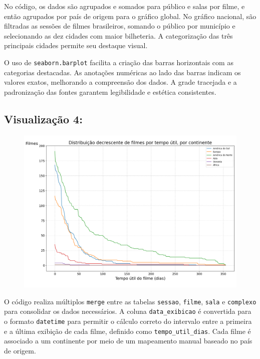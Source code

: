 \documentclass{article}
\begin{document}
No código, os dados são agrupados e somados para público e salas por filme, e então agrupados por país de origem para o gráfico global. No gráfico nacional, são filtradas as sessões de filmes brasileiros, somando o público por município e selecionando as dez cidades com maior bilheteria. A categorização das três principais cidades permite seu destaque visual.

O uso de \texttt{seaborn.barplot} facilita a criação das barras horizontais com as categorias destacadas. As anotações numéricas ao lado das barras indicam os valores exatos, melhorando a compreensão dos dados. A grade tracejada e a padronização das fontes garantem legibilidade e estética consistentes.~\cite{tufte_visual_display}\cite{tufte_visual_explanations}


\subsection*{Visualização 4:}
\begin{figure}[H]
    \centerline{\includegraphics[width = \linewidth]{img/Figure_4.png}}
\end{figure}

O código realiza múltiplos \texttt{merge} entre as tabelas \texttt{sessao}, \texttt{filme}, \texttt{sala} e \texttt{complexo} para consolidar os dados necessários. A coluna \texttt{data\_exibicao} é convertida para o formato \texttt{datetime} para permitir o cálculo correto do intervalo entre a primeira e a última exibição de cada filme, definido como \texttt{tempo\_util\_dias}. Cada filme é associado a um continente por meio de um mapeamento manual baseado no país de origem.
\end{document}
